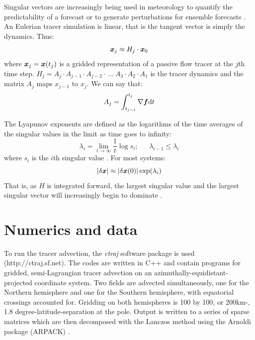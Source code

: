 Singular vectors are increasingly being used in meteorology to quantify the
predictability of a forecast or to generate perturbations for ensemble
forecasts \citep{Tang_etal2006}.  
An Eulerian tracer simulation is linear, that is
the tangent vector is simply the dynamics.  Thus:
\begin{equation}
\boldsymbol x_j \approx H_j \cdot \boldsymbol x_0
\end{equation}
where $\boldsymbol x_j=\boldsymbol x(t_j)$ is a gridded representation of a 
passive flow tracer at the $j$th time step.
$H_j=A_j \cdot A_{j-1} \cdot A_{j-2} \cdot ~ ... ~ A_3 \cdot A_2 \cdot A_1$
is the tracer dynamics and the matrix $A_j$ maps $x_{j-1}$ to $x_j$.
We can say that:
\begin{equation}
A_j = \int_{t_{j-1}}^{t_j} \nabla \boldsymbol f \mathrm d t
\end{equation}

The Lyapunov exponents are defined as the logarithms of the time averages
of the singular values in the limit as time goes to infinity:
\begin{equation}
\lambda_i = \lim_{t \rightarrow \infty} \frac{1}{t} \log s_i;
~~~~~~~\lambda_{i-1} \le \lambda_i
\end{equation}
where $s_i$ is the $i$th singular value \citep{Ott1993}.
For most systems:
\begin{equation}
|\delta \boldsymbol x| \approx |\delta \boldsymbol x(0) | \exp(\lambda_i)
\label{lambda1}
\end{equation}
That is, as $H$ is integrated forward, the largest singular value and
the largest singular vector will increasingly begin to dominate
\citep{Ott1993}.

\section{Numerics and data}

To run the tracer advection, the \textit{ctraj} software package is used
(http://ctraj.sf.net).  The codes are written in C++ and contain programs
for gridded, semi-Lagrangian tracer advection on an 
azimuthally-equidistant-projected coordinate system.
Two fields are advected simultaneously, one for the Northern hemisphere
and one for the Southern hemisphere, with equatorial crossings accounted for.
Gridding on both hemispheres is 100 by 100, or 200km-,
1.8 degree-latitude-separation at the pole.  
Output is written to a series of sparse matrices which are then
decomposed with the Lanczos method \citep{Golub_Van_Loan1996} using the
Arnoldi package (ARPACK) \citep{Lehoucq_Scott1996}.


